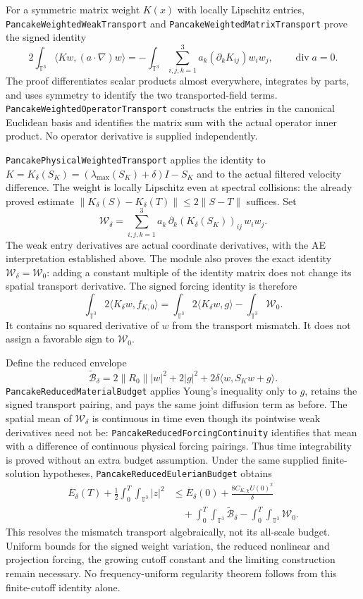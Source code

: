 \documentclass[11pt]{article}
\theoremstyle{definition}
\begin{document}
For a symmetric matrix weight $K(x)$ with locally Lipschitz entries,
\texttt{PancakeWeightedWeakTransport} and
\texttt{PancakeWeightedMatrixTransport} prove the signed identity
\[
 2\int_{\mathbb T^3}\langle Kw,(a\cdot\nabla)w\rangle
   =-\int_{\mathbb T^3}\sum_{i,j,k=1}^3
             a_k(\partial_k K_{ij})w_iw_j,
 \qquad \operatorname{div}a=0.
\]
The proof differentiates scalar products almost everywhere, integrates by
parts, and uses symmetry to identify the two transported-field terms.
\texttt{PancakeWeightedOperatorTransport} constructs the entries in the
canonical Euclidean basis and identifies the matrix sum with the actual
operator inner product. No operator derivative is supplied independently.

\texttt{PancakePhysicalWeightedTransport} applies the identity to
$K=K_\delta(S_K)=(\lambda_{\max}(S_K)+\delta)I-S_K$ and to the actual
filtered velocity difference. The weight is locally Lipschitz even at
spectral collisions: the already proved estimate
$\|K_\delta(S)-K_\delta(T)\|\le2\|S-T\|$ suffices.
Set
\[
 \mathcal W_\delta=\sum_{i,j,k=1}^3
       a_k\,\partial_k(K_\delta(S_K))_{ij}\,w_iw_j.
\]
The weak entry derivatives are actual coordinate derivatives, with the
AE interpretation established above. The module also proves the exact
identity $\mathcal W_\delta=\mathcal W_0$: adding a constant multiple
of the identity matrix does not change its spatial transport derivative.
The signed forcing identity is therefore
\[
 \int_{\mathbb T^3}2\langle K_\delta w,f_{K,0}\rangle
 =\int_{\mathbb T^3}2\langle K_\delta w,g\rangle
       -\int_{\mathbb T^3}\mathcal W_0.
\]
It contains no squared derivative of $w$ from the transport mismatch.
It does not assign a favorable sign to $\mathcal W_0$.

Define the reduced envelope
\[
 \widetilde{\mathcal B}_\delta
   =2\|R_0\||w|^2+2|g|^2
                  +2\delta\langle w,S_Kw+g\rangle.
\]
\texttt{PancakeReducedMaterialBudget} applies Young's inequality only
to $g$, retains the signed transport pairing, and pays the same joint
diffusion term as before. The spatial mean of $\mathcal W_\delta$ is
continuous in time even though its pointwise weak derivatives need not
be: \texttt{PancakeReducedForcingContinuity} identifies that mean with
a difference of continuous physical forcing pairings. Thus time
integrability is proved without an extra budget assumption.
Under the same supplied finite-solution hypotheses,
\texttt{PancakeReducedEulerianBudget} obtains
\[
 \begin{aligned}
 \overline E_\delta(T)
    +\frac12\int_0^T\!\int_{\mathbb T^3}|z|^2
 &\le \overline E_\delta(0)
       +\frac{8C_{K,\chi}U(0)^2}{\delta}\\
 &\quad+\int_0^T\!\int_{\mathbb T^3}\widetilde{\mathcal B}_\delta
       -\int_0^T\!\int_{\mathbb T^3}\mathcal W_0.
 \end{aligned}
\]
This resolves the mismatch transport algebraically, not its all-scale
budget. Uniform bounds for the signed weight variation, the reduced nonlinear
and projection forcing, the growing cutoff constant and the limiting
construction remain necessary. No frequency-uniform regularity theorem
follows from this finite-cutoff identity alone.
\end{document}
